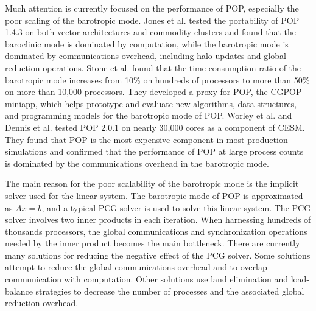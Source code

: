 \documentclass{sig-alternate}
\begin{document}
Much attention is currently focused on the performance of POP, especially the poor scaling of the barotropic mode.
Jones et al. \cite{pop05} tested the portability of POP 1.4.3 on both vector architectures and commodity clusters and found that the baroclinic mode is dominated by computation, while the barotropic mode is dominated by communications overhead, including halo updates and global reduction operations. Stone et al. \cite{stone2011cgpop} found that the time consumption ratio of the barotropic mode increases from 10\% on hundreds of processors to more than 50\% on more than 10,000 processors.
They developed a proxy for POP, the CGPOP miniapp, which helps prototype and evaluate new algorithms, data structures, and programming models for the barotropic mode of POP.
Worley et al. \cite{Worley:2011:PCE:2063384.2063457} and Dennis et al. \cite{dennis2012computational} tested POP 2.0.1 on nearly 30,000 cores as a component of CESM. They found that POP is the most expensive component in most production simulations and confirmed that the performance of POP at large process counts is dominated by the communications overhead in the barotropic mode.

The main reason for the poor scalability of the barotropic mode is the implicit solver used for the linear system. The barotropic mode of POP is approximated as $Ax=b$, and a typical PCG solver is used to solve this linear system. The PCG solver involves two inner products in each iteration. When harnessing hundreds of thousands processors, the global communications and synchronization operations needed by the inner product becomes the main bottleneck.
There are currently many solutions for reducing the negative effect of the PCG solver. Some solutions attempt to reduce the global communications overhead\cite{dAzevedo1999lapack} and to overlap communication with computation\cite{beare1997optimisation}. Other solutions use land elimination and load-balance strategies\cite{dennis2007inverse, dennis2008scaling} to decrease the number of processes and the associated global reduction overhead.
\end{document}
